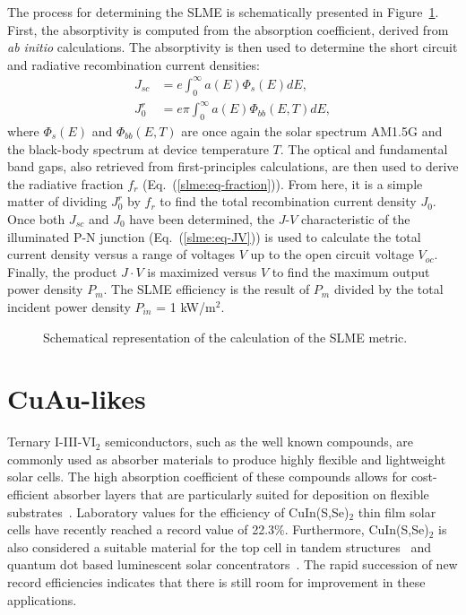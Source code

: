 \begin{refsection}
The process for determining the SLME is schematically presented in 
Figure~\ref{slme:fig-SLMEcalc}. First, the absorptivity is computed from the 
absorption coefficient, derived from \textit{ab initio} calculations. 
The absorptivity is then used to determine the short 
circuit and radiative recombination current densities: 
\begin{equation} \label{slme:eq-currents} 
\begin{aligned} 
J_{sc} &= e \int_0^\infty a(E)  \Phi_{s} (E) dE, 
\\ J_0^r &= e\pi \int_0^\infty a(E)  \Phi_{bb} (E,T) dE, 
\end{aligned} 
\end{equation} 
where $\Phi_{s}(E)$ and $\Phi_{bb}(E,T)$ are once again the solar spectrum AM1.5G  
and the black-body spectrum at device temperature $T$. The optical 
and fundamental band gaps, also retrieved from first-principles calculations, 
are then used to derive the radiative fraction $f_r$ (Eq.~(\ref{slme:eq-fraction})). From 
here, it is a simple matter of dividing $J_0^r$ by $f_r$ to find the total 
recombination current density $J_0$. Once both $J_{sc}$ and $J_0$ have been determined, the $J$-$V$ characteristic of the illuminated P-N junction 
(Eq.~(\ref{slme:eq-JV})) is used to calculate the total current density versus a range 
of voltages $V$ up to the open circuit voltage $V_{oc}$. Finally,  
the product $J\cdot V$ is maximized versus $V$ to find the maximum output power density 
$P_m$. The SLME efficiency is the result of $P_m$ divided by the total 
incident power density $P_{in}$ = 1 kW/m$^2$. 
 
 
\begin{figure}[ht]  
\centering 

\caption{Schematical representation of the calculation of the SLME metric.} 
\label{slme:fig-SLMEcalc} 
\end{figure} 
 
\section{CuAu-likes} \label{slme:sec-CuAu} 
 
Ternary I-III-VI$_2$ semiconductors, such as the well known 
 compounds, are commonly used as absorber materials to 
produce highly flexible and lightweight solar cells. The high absorption 
coefficient of these compounds allows for cost-efficient absorber layers that 
are particularly suited for deposition on flexible 
substrates~\cite{Reinhard2013}. Laboratory values for the efficiency of 
CuIn(S,Se)$_2$ thin film solar cells have recently reached a record value of 
22.3\%. Furthermore, CuIn(S,Se)$_2$ is also considered a suitable material for 
the top cell in tandem structures~\cite{Cheek2013} and quantum dot based 
luminescent solar concentrators~\cite{Hu2015}. The rapid succession of new 
record efficiencies indicates that there is still room for improvement in 
these applications. 
 

\end{refsection}
